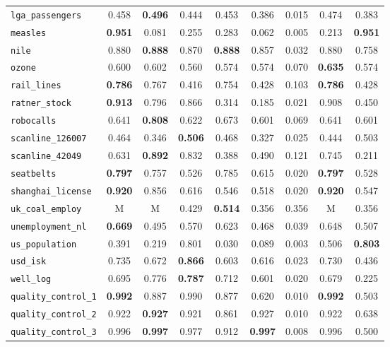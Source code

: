 \begin{tabular}{lcccccccc}
\verb+lga_passengers+ & 0.458 & \textbf{0.496} & 0.444 & 0.453 & 0.386 & 0.015 & 0.474 & 0.383\\
\verb+measles+ & \textbf{0.951} & 0.081 & 0.255 & 0.283 & 0.062 & 0.005 & 0.213 & \textbf{0.951}\\
\verb+nile+ & 0.880 & \textbf{0.888} & 0.870 & \textbf{0.888} & 0.857 & 0.032 & 0.880 & 0.758\\
\verb+ozone+ & 0.600 & 0.602 & 0.560 & 0.574 & 0.574 & 0.070 & \textbf{0.635} & 0.574\\
\verb+rail_lines+ & \textbf{0.786} & 0.767 & 0.416 & 0.754 & 0.428 & 0.103 & \textbf{0.786} & 0.428\\
\verb+ratner_stock+ & \textbf{0.913} & 0.796 & 0.866 & 0.314 & 0.185 & 0.021 & 0.908 & 0.450\\
\verb+robocalls+ & 0.641 & \textbf{0.808} & 0.622 & 0.673 & 0.601 & 0.069 & 0.641 & 0.601\\
\verb+scanline_126007+ & 0.464 & 0.346 & \textbf{0.506} & 0.468 & 0.327 & 0.025 & 0.444 & 0.503\\
\verb+scanline_42049+ & 0.631 & \textbf{0.892} & 0.832 & 0.388 & 0.490 & 0.121 & 0.745 & 0.211\\
\verb+seatbelts+ & \textbf{0.797} & 0.757 & 0.526 & 0.785 & 0.615 & 0.020 & \textbf{0.797} & 0.528\\
\verb+shanghai_license+ & \textbf{0.920} & 0.856 & 0.616 & 0.546 & 0.518 & 0.020 & \textbf{0.920} & 0.547\\
\verb+uk_coal_employ+ & M & M & 0.429 & \textbf{0.514} & 0.356 & 0.356 & M & 0.356\\
\verb+unemployment_nl+ & \textbf{0.669} & 0.495 & 0.570 & 0.623 & 0.468 & 0.039 & 0.648 & 0.507\\
\verb+us_population+ & 0.391 & 0.219 & 0.801 & 0.030 & 0.089 & 0.003 & 0.506 & \textbf{0.803}\\
\verb+usd_isk+ & 0.735 & 0.672 & \textbf{0.866} & 0.603 & 0.616 & 0.023 & 0.730 & 0.436\\
\verb+well_log+ & 0.695 & 0.776 & \textbf{0.787} & 0.712 & 0.601 & 0.020 & 0.679 & 0.225\\
\midrule
\verb+quality_control_1+ & \textbf{0.992} & 0.887 & 0.990 & 0.877 & 0.620 & 0.010 & \textbf{0.992} & 0.503\\
\verb+quality_control_2+ & 0.922 & \textbf{0.927} & 0.921 & 0.861 & 0.927 & 0.010 & 0.922 & 0.638\\
\verb+quality_control_3+ & 0.996 & \textbf{0.997} & 0.977 & 0.912 & \textbf{0.997} & 0.008 & 0.996 & 0.500\\

\end{tabular}

